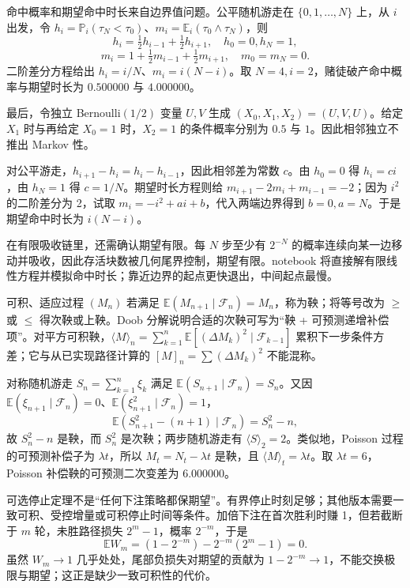 命中概率和期望命中时长来自边界值问题。公平随机游走在 $\{0,1,\ldots,N\}$ 上，从 $i$ 出发，令 $h_i=\mathbb P_i(\tau_N<\tau_0)$、$m_i=\mathbb E_i(\tau_0\wedge\tau_N)$，则
\[
h_i=\tfrac12h_{i-1}+\tfrac12h_{i+1},\quad h_0=0,h_N=1,
\]
\[
m_i=1+\tfrac12m_{i-1}+\tfrac12m_{i+1},\quad m_0=m_N=0.
\]
二阶差分方程给出 $h_i=i/N$、$m_i=i(N-i)$。取 $N=4,i=2$，赌徒破产命中概率与期望时长为 $0.500000$ 与 $4.000000$。

最后，令独立 Bernoulli$(1/2)$ 变量 $U,V$ 生成 $(X_0,X_1,X_2)=(U,V,U)$。给定 $X_1$ 时与再给定 $X_0=1$ 时，$X_2=1$ 的条件概率分别为 $0.5$ 与 $1$。因此相邻独立不推出 Markov 性。


对公平游走，$h_{i+1}-h_i=h_i-h_{i-1}$，因此相邻差为常数 $c$。由 $h_0=0$ 得 $h_i=ci$，由 $h_N=1$ 得 $c=1/N$。期望时长方程则给 $m_{i+1}-2m_i+m_{i-1}=-2$；因为 $i^2$ 的二阶差分为 2，试取 $m_i=-i^2+ai+b$，代入两端边界得到 $b=0,a=N$。于是期望命中时长为 $i(N-i)$。

在有限吸收链里，还需确认期望有限。每 $N$ 步至少有 $2^{-N}$ 的概率连续向某一边移动并吸收，因此存活块数被几何尾界控制，期望有限。notebook 将直接解有限线性方程并模拟命中时长；靠近边界的起点更快退出，中间起点最慢。


可积、适应过程 $(M_n)$ 若满足 $\mathbb E(M_{n+1}\mid\mathcal F_n)=M_n$，称为鞅；将等号改为 $\ge$ 或 $\le$ 得次鞅或上鞅。Doob 分解说明合适的次鞅可写为“鞅 + 可预测递增补偿项”。对平方可积鞅，$\langle M\rangle_n=\sum_{k=1}^n\mathbb E[(\Delta M_k)^2\mid\mathcal F_{k-1}]$ 累积下一步条件方差；它与从已实现路径计算的 $[M]_n=\sum(\Delta M_k)^2$ 不能混称。

对称随机游走 $S_n=\sum_{k=1}^n\xi_k$ 满足 $\mathbb E(S_{n+1}\mid\mathcal F_n)=S_n$。又因 $\mathbb E(\xi_{n+1}\mid\mathcal F_n)=0$、$\mathbb E(\xi_{n+1}^2\mid\mathcal F_n)=1$，
\[
\mathbb E(S_{n+1}^2-(n+1)\mid\mathcal F_n)=S_n^2-n,
\]
故 $S_n^2-n$ 是鞅，而 $S_n^2$ 是次鞅；两步随机游走有 $\langle S\rangle_2=2$。类似地，Poisson 过程的可预测补偿子为 $\lambda t$，所以 $M_t=N_t-\lambda t$ 是鞅，且 $\langle M\rangle_t=\lambda t$。取 $\lambda t=6$，Poisson 补偿鞅的可预测二次变差为 $6.000000$。

可选停止定理不是“任何下注策略都保期望”。有界停止时刻足够；其他版本需要一致可积、受控增量或可积停止时间等条件。加倍下注在首次胜利时赚 1，但若截断于 $m$ 轮，未胜路径损失 $2^m-1$，概率 $2^{-m}$，于是
\[
\mathbb E W_m=(1-2^{-m})-2^{-m}(2^m-1)=0.
\]
虽然 $W_m\to1$ 几乎处处，尾部负损失对期望的贡献为 $1-2^{-m}\to1$，不能交换极限与期望；这正是缺少一致可积性的代价。

